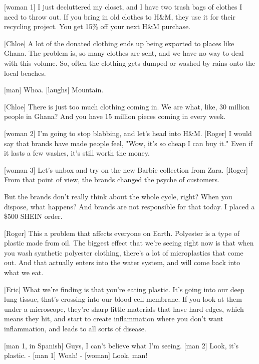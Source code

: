 \documentclass[a4paper]{article}
\begin{document}
	
	
	[woman 1] I just decluttered my closet, and I have two trash bags of clothes I need to throw out.
	If you bring in old clothes to H\&M, they use it for their recycling project.
	You get 15\% off your next H\&M purchase.
	
	
	[Chloe] A lot of the donated clothing ends up being exported to places like Ghana.
	The problem is, so many clothes are sent, and we have no way to deal with this volume.
	So, often the clothing gets dumped or washed by rains onto the local beaches.
	
	
	[man] Whoa.
	[laughs]
	Mountain.
	
	
	[Chloe] There is just too much clothing coming in.
	We are what, like, 30 million people in Ghana?
	And you have 15 million pieces coming in every week.
	
	
	[woman 2] I'm going to stop blabbing, and let's head into H\&M.
	[Roger] I would say that brands have made people feel, "Wow, it's so cheap I can buy it."
	Even if it lasts a few washes, it's still worth the money.
	
	
	
	[woman 3] Let's unbox and try on the new Barbie collection from Zara.
	[Roger] From that point of view, the brands changed the psyche of customers.
	
	
	But the brands don't really think about the whole cycle, right?
	When you dispose, what happens?
	And brands are not responsible for that today.
	I placed a \$500 SHEIN order.
	
	
	
	[Roger] This a problem that affects everyone on Earth.
	Polyester is a type of plastic made from oil.
	The biggest effect that we're seeing right now
	is that when you wash synthetic polyester clothing, there's a lot of microplastics that come out.
	And that actually enters into the water system, and will come back into what we eat.
	
	
	
	[Eric] What we're finding is that you're eating plastic.
	It's going into our deep lung tissue, that's crossing into our blood cell membrane.
	If you look at them under a microscope, they're sharp little materials that have hard edges, which means they hit, and start to create inflammation where you don't want inflammation, and leads to all sorts of disease.
	
	
	[man 1, in Spanish] Guys, I can't believe what I'm seeing.
	[man 2] Look, it's plastic.
	- [man 1] Woah! - [woman] Look, man!
	
\end{document}
